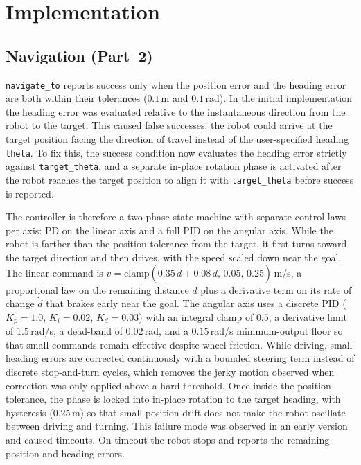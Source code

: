 \documentclass[conference]{IEEEtran}
\begin{document}
\section{Implementation}

\subsection{Navigation (Part~2)}
\texttt{navigate\_to} reports success only when the position error and the
heading error are both within their tolerances ($0.1$\,m and $0.1$\,rad). In
the initial implementation the heading error was evaluated relative to the
instantaneous direction from the robot to the target. This caused false
successes: the robot could arrive at the target position facing the direction
of travel instead of the user-specified heading \texttt{theta}. To fix this,
the success condition now evaluates the heading error strictly against
\texttt{target\_theta}, and a separate in-place rotation phase is activated
after the robot reaches the target position to align it with
\texttt{target\_theta} before success is reported.

The controller is therefore a two-phase state machine with separate control
laws per axis: PD on the linear axis and a full PID on the angular axis.
While the robot is farther than the position tolerance from the target, it
first turns toward the target direction and then drives, with the speed scaled
down near the goal. The linear command is
$v=\mathrm{clamp}(0.35\,d+0.08\,\dot d,\,0.05,\,0.25)$\,m/s, a proportional
law on the remaining distance $d$ plus a derivative term on its rate of change
$\dot d$ that brakes early near the goal. The angular axis uses a discrete
PID ($K_p=1.0$, $K_i=0.02$, $K_d=0.03$) with an integral clamp of $0.5$, a
derivative limit of $1.5$\,rad/s, a dead-band of $0.02$\,rad, and a
$0.15$\,rad/s minimum-output floor so that small commands remain effective
despite wheel friction. While driving, small heading
errors are corrected continuously with a bounded steering term instead of
discrete stop-and-turn cycles, which removes the jerky motion observed when
correction was only applied above a hard threshold. Once inside the position
tolerance, the phase is locked into in-place rotation to the target heading,
with hysteresis ($0.25$\,m) so that small position drift does not make the
robot oscillate between driving and turning. This failure mode was observed in
an early version and caused timeouts. On timeout the robot stops and reports
the remaining position and heading errors.
\end{document}
